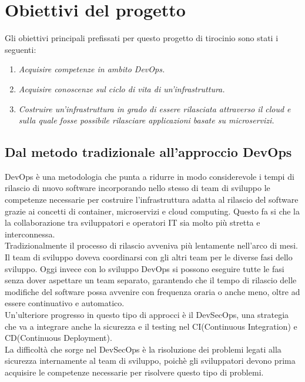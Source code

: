 \documentclass[a4paper,12pt]{report}
\begin{document}
\section{Obiettivi del progetto}
Gli obiettivi principali prefissati per questo progetto di tirocinio sono stati i seguenti:
\begin{enumerate}
\item \textit{Acquisire competenze in ambito DevOps.}
\item \textit{Acquisire conoscenze sul ciclo di vita di un'infrastruttura.}
\item \textit{Costruire un'infrastruttura in grado di essere rilasciata attraverso il cloud e sulla quale fosse possibile rilasciare applicazioni basate su microservizi.}
\end{enumerate}
\subsection{Dal metodo tradizionale all'approccio DevOps}
DevOps è una metodologia che punta a ridurre in modo considerevole i tempi di rilascio di nuovo software incorporando nello stesso di team di sviluppo le competenze necessarie per costruire l'infrastruttura adatta al rilascio del software grazie ai concetti di container, microservizi e cloud computing. Questo fa si che la la collaborazione tra sviluppatori e operatori IT sia molto più stretta e interconnessa. \cite{defdevops}\\
Tradizionalmente il processo di rilascio avveniva più lentamente nell'arco di mesi. Il team di sviluppo doveva coordinarsi con gli altri team per le diverse fasi dello sviluppo. Oggi invece con lo sviluppo DevOps si possono eseguire tutte le fasi senza dover aspettare un team separato, garantendo che il tempo di rilascio delle modifiche del software possa avvenire con frequenza oraria o anche meno, oltre ad essere continuativo e automatico.\\
Un'ulteriore progresso in questo tipo di approcci è il DevSecOps, una strategia che va a integrare anche la sicurezza e il testing nel CI(Continuous Integration) e CD(Continuous Deployment). \\La difficoltà che sorge nel DevSecOps è la risoluzione dei problemi legati alla sicurezza internamente al team di sviluppo, poichè gli sviluppatori devono prima acquisire le competenze necessarie per risolvere questo tipo di problemi.
\end{document}
